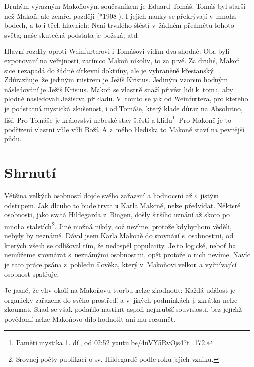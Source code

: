 Druhým výrazným Makoňovým současníkem je Eduard Tomáš. Tomáš byl starší než
Makoň, ale zemřel později (*1908 ). I jejich nauky se překrývají
v~mnoha bodech, a to i těch hlavních: Není trvalého štěstí v~žádném předmětu
tohoto světa; naše skutečná podstata je božská; atd.

Hlavní rozdíly oproti Weinfurterovi i Tomášovi vidím dva shodné: Oba byli
exponovaní na veřejnosti, zatímco Makoň nikoliv, to za prvé. Za druhé, Makoň
sice nezapadá do žádné církevní doktríny, ale je vyhraněně křesťanský.
Zdůrazňuje, že jediným mistrem je Ježíš Kristus. Jediným vzorem hodným
následování je Ježíš Kristus. Makoň se vlastně snaží přivést lidi k~tomu, aby
plodně následovali Ježíšova příkladu. V~tomto se jak od Weinfurtera, pro kterého
je podstatná mystická zkušenost, i od Tomáše, který klade důraz na Absolutno,
liší. Pro Tomáše je království nebeské stav štěstí a klidu\footnote{Paměti
mystika 1. díl, od 02:52 \href{https://youtu.be/4nVY5RvOjs4?t=172}{youtu.be/4nVY5RvOjs4?t=172}.}. Pro Makoně je to
podřízení vlastní vůle vůli Boží. A z~mého hlediska to Makoně staví na pevnější
půdu.

\section{Shrnutí}

Většina velkých osobností dojde svého zařazení a hodnocení až s~jistým odstupem.
Jak dlouho to bude trvat u Karla Makoně, nelze předvídat. Některé osobnosti,
jako svatá Hildegarda z~Bingen, došly širšího uznání až skoro po mnoha
staletích\footnote{Srovnej počty publikací o sv. Hildegardě podle roku jejich
vzniku.}. Jiné možná nikdy, což nevíme, protože kdybychom věděli, nebyly by
neznámé. Dával jsem Karla Makoně do srovnání s~osobnostmi, od kterých všech se
odlišoval tím, že nedospěl popularity. Je to logické, neboť ho nemůžeme
srovnávat s~neznámými osobnostmi, opět protože o nich nevíme. Navíc je tato
práce psána z~pohledu člověka, který v~Makoňovi velkou a vyčnívající osobnost
spatřuje.

Je jasné, že vliv okolí na Makoňovu tvorbu nelze zhodnotit: Každá událost je
organicky zařazena do svého prostředí a v~jiných podmínkách ji zkrátka nelze
zkoumat. Snad se však podařilo nastínit aspoň nejhrubší souvislosti, bez jejichž
povědomí nelze Makoňovo dílo hodnotit ani mu rozumět.
